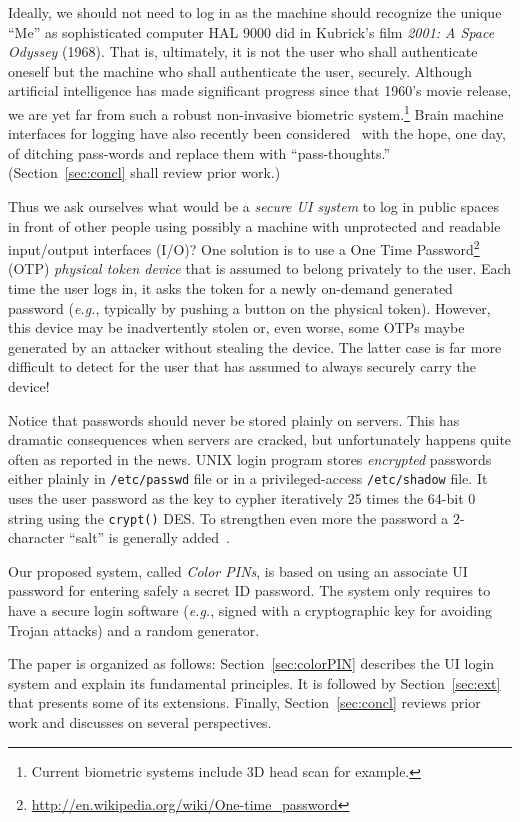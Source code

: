 \documentclass[12pt,onecolumn]{article}
\begin{document}
Ideally, we should not need to log in as the machine should recognize the unique ``Me'' as sophisticated computer HAL 9000 did in Kubrick's film {\it 2001: A Space Odyssey} (1968). That is, ultimately, it is not the user who shall authenticate oneself but the machine who shall authenticate the user, securely.
Although artificial intelligence has made significant progress since that 1960's movie release, we are yet far from such a robust non-invasive biometric system.\footnote{Current biometric systems include 3D head scan for example.} 
Brain machine interfaces  for logging have also recently been considered~\cite{Passthoughts-2013} with the hope, one day, of ditching pass-words and replace them with ``pass-thoughts.'' (Section~\ref{sec:concl} shall review prior work.)
 
Thus we ask ourselves what would be a {\em secure UI system} to log in public spaces in front of other people using possibly a machine with unprotected and readable input/output interfaces (I/O)? 
One solution is to use a One Time Password\footnote{\url{http://en.wikipedia.org/wiki/One-time_password}} (OTP) {\em physical token device} that is assumed to belong privately to the user. Each time the user logs in, it asks the token for a newly on-demand generated password ({\it e.g.}, typically by pushing a button on the physical token).
However, this device may be inadvertently stolen or, even worse, some OTPs  maybe generated by an attacker without stealing the device.
The latter case is far more difficult to detect for the user that has assumed to always securely carry the device!

Notice that passwords should never be stored plainly on servers. This has dramatic consequences when servers are cracked, but unfortunately happens quite often as reported in the news.
UNIX login program stores {\em encrypted} passwords either plainly in {\tt /etc/passwd} file or in a privileged-access {\tt /etc/shadow} file.
It uses the user password as the key to cypher iteratively 25 times the 64-bit 0 string using the {\tt crypt()} DES.
To strengthen even more the password a $2$-character ``salt'' is generally added~\cite{Salt-2000}.
 
Our proposed system, called {\em Color PINs}, is based on using an associate UI password for entering safely a secret ID password.
The system only requires to have a secure login software ({\it e.g.}, signed with a cryptographic key for avoiding Trojan attacks) and a random generator.
 
The paper is organized as follows: 
Section~\ref{sec:colorPIN} describes the   UI login system and explain its fundamental principles.
It is followed by Section~\ref{sec:ext} that presents some of its extensions.
Finally, Section~\ref{sec:concl} reviews prior work and discusses on several perspectives.
\end{document}
